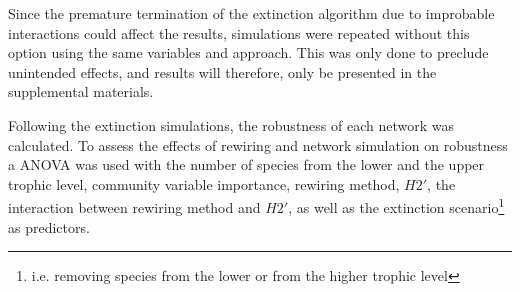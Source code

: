 \documentclass[12pt,a4paper]{article}
\begin{document}
Since the premature termination of the extinction algorithm due to improbable interactions could affect the results, simulations were repeated without this option using the same variables and approach. This was only done to preclude unintended effects, and results will therefore, only be presented in the supplemental materials.


Following the extinction simulations, the robustness of each network was calculated. To assess the effects of rewiring and network simulation on robustness a ANOVA was used with the number of species from the lower and the upper trophic level, community variable importance, rewiring method, $H2'$, the interaction between rewiring method and $H2'$, as well as the extinction scenario\footnote{i.e. removing species from the lower or from the higher trophic level} as predictors.

 
\end{document}
